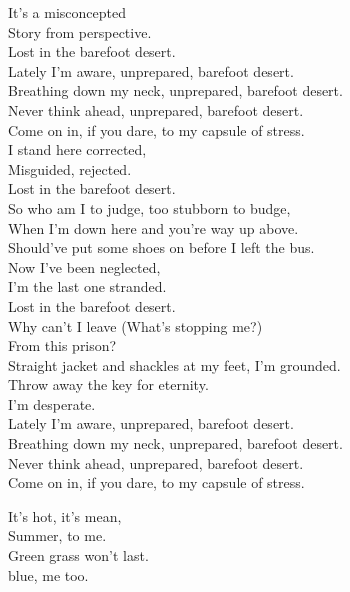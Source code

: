 It's a misconcepted \\
Story from perspective. \\
Lost in the barefoot desert. \\

Lately I'm aware, unprepared, barefoot desert. \\
Breathing down my neck, unprepared, barefoot desert. \\
Never think ahead, unprepared, barefoot desert. \\
Come on in, if you dare, to my capsule of stress. \\

I stand here corrected, \\
Misguided, rejected. \\
Lost in the barefoot desert. \\

So who am I to judge, too stubborn to budge, \\
When I'm down here and you're way up above. \\
Should've put some shoes on before I left the bus. \\

Now I've been neglected, \\
I'm the last one stranded. \\
Lost in the barefoot desert. \\
Why can't I leave (What's stopping me?) \\
From this prison? \\
Straight jacket and shackles at my feet, I'm grounded. \\
Throw away the key for eternity. \\
I'm desperate. \\

Lately I'm aware, unprepared, barefoot desert. \\
Breathing down my neck, unprepared, barefoot desert. \\
Never think ahead, unprepared, barefoot desert. \\
Come on in, if you dare, to my capsule of stress. \\





It's hot, it's mean, \\
Summer, to me. \\
Green grass won't last. \\
 blue, me too. \\

